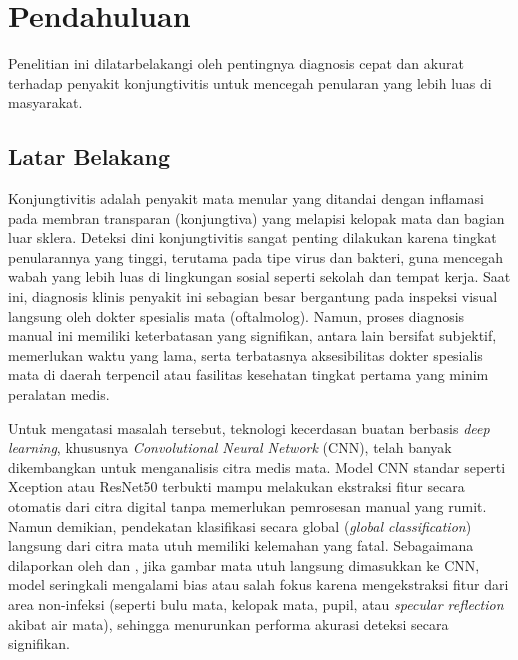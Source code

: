 \chapter{Pendahuluan}
\label{chap:pendahuluan}


Penelitian ini dilatarbelakangi oleh pentingnya diagnosis cepat dan akurat terhadap penyakit konjungtivitis untuk mencegah penularan yang lebih luas di masyarakat.

\section{Latar Belakang}
\label{sec:latar-belakang}

Konjungtivitis adalah penyakit mata menular yang ditandai dengan inflamasi pada membran transparan (konjungtiva) yang melapisi kelopak mata dan bagian luar sklera. Deteksi dini konjungtivitis sangat penting dilakukan karena tingkat penularannya yang tinggi, terutama pada tipe virus dan bakteri, guna mencegah wabah yang lebih luas di lingkungan sosial seperti sekolah dan tempat kerja. Saat ini, diagnosis klinis penyakit ini sebagian besar bergantung pada inspeksi visual langsung oleh dokter spesialis mata (oftalmolog). Namun, proses diagnosis manual ini memiliki keterbatasan yang signifikan, antara lain bersifat subjektif, memerlukan waktu yang lama, serta terbatasnya aksesibilitas dokter spesialis mata di daerah terpencil atau fasilitas kesehatan tingkat pertama yang minim peralatan medis.

Untuk mengatasi masalah tersebut, teknologi kecerdasan buatan berbasis \textit{deep learning}, khususnya \textit{Convolutional Neural Network} (CNN), telah banyak dikembangkan untuk menganalisis citra medis mata. Model CNN standar seperti Xception \parencite{ali2025automated} atau ResNet50 \parencite{sangeethaa2024enhanced} terbukti mampu melakukan ekstraksi fitur secara otomatis dari citra digital tanpa memerlukan pemrosesan manual yang rumit. Namun demikian, pendekatan klasifikasi secara global (\textit{global classification}) langsung dari citra mata utuh memiliki kelemahan yang fatal. Sebagaimana dilaporkan oleh \textcite{sangeethaa2024enhanced} dan \textcite{jiang2023automatic}, jika gambar mata utuh langsung dimasukkan ke CNN, model seringkali mengalami bias atau salah fokus karena mengekstraksi fitur dari area non-infeksi (seperti bulu mata, kelopak mata, pupil, atau \textit{specular reflection} akibat air mata), sehingga menurunkan performa akurasi deteksi secara signifikan.

